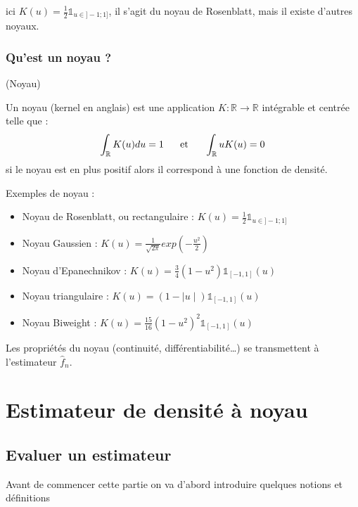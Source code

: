 \documentclass[
]{book}
\begin{document}
ici \(K(u)= \frac12 \mathds{1}_{u \in ]-1;1]}\), il s'agit du noyau de Rosenblatt, mais il existe d'autres noyaux.

\hypertarget{quest-un-noyau}{%
\subsection{Qu'est un noyau ?}\label{quest-un-noyau}}

\begin{dfn} (Noyau)  

Un noyau (kernel en anglais) est une application $K:\mathbb{R}\rightarrow\mathbb{R}$ intégrable et centrée telle que :
$$\int_{\mathbb R} K(u) du = 1 ~~~~ \hbox{ et } ~~~~ \int_{\mathbb R} u K(u)=0$$
si le noyau est en plus positif alors il correspond à une fonction de densité.
\end{dfn}

Exemples de noyau :

\begin{itemize}
\item
  Noyau de Rosenblatt, ou rectangulaire : \(K(u)= \frac12 \mathds{1}_{u\in]-1;1]}\)
\item
  Noyau Gaussien : \(K(u) =\frac1{\sqrt{2\pi}}exp(-\frac{u^2}2)\)
\item
  Noyau d'Epanechnikov : \(K(u) =\frac34(1-u^2)\mathds{1}_{[-1,1]}(u)\)
\item
  Noyau triangulaire : \(K(u) = (1-\mid u \mid)\mathds{1}_{[-1,1]}(u)\)
\item
  Noyau Biweight : \(K(u) = \frac{15}{16}(1-u^2)^2\mathds{1}_{[-1,1]}(u)\)
\end{itemize}

Les propriétés du noyau (continuité, différentiabilité\ldots) se transmettent à l'estimateur \(\hat f_n\).

\hypertarget{estimateur-de-densituxe9-uxe0-noyau}{%
\chapter{Estimateur de densité à noyau}\label{estimateur-de-densituxe9-uxe0-noyau}}

\hypertarget{evaluer-un-estimateur}{%
\section{Evaluer un estimateur}\label{evaluer-un-estimateur}}

Avant de commencer cette partie on va d'abord introduire quelques notions et définitions\newline
\end{document}

